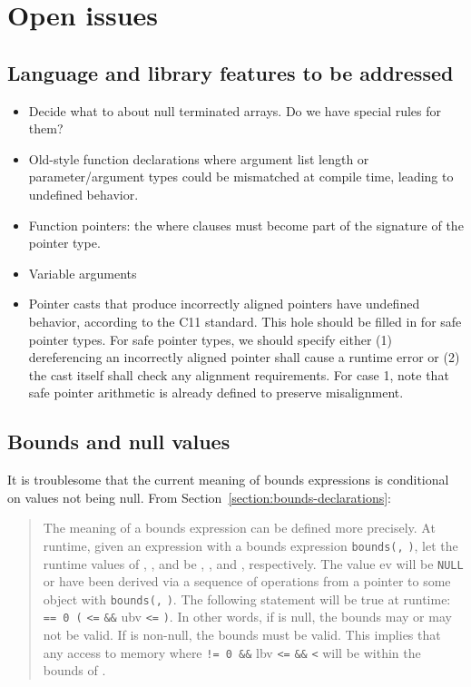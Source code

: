 
\chapter{Open issues}
\label{chapter:open-issues}

\section{Language and library features to be addressed}

\begin{itemize}
\item
  Decide what to about null terminated arrays. Do we have special rules
  for them?
\item
  Old-style function declarations where argument list length or
  parameter/argument types could be mismatched at compile time, leading
  to undefined behavior.
\item
  Function pointers: the where clauses must become part of the signature
  of the pointer type.
\item
  Variable arguments
\item
  Pointer casts that produce incorrectly aligned pointers have undefined
  behavior, according to the C11 standard. This hole should be filled in
  for safe pointer types. For safe pointer types, we should specify
  either (1) dereferencing an incorrectly aligned pointer shall cause a
  runtime error or (2) the cast itself shall check any alignment
  requirements. For case 1, note that safe pointer arithmetic is already
  defined to preserve misalignment.
\end{itemize}

\section{Bounds and null values}

It is troublesome that the current meaning of bounds expressions is
conditional on values not being null. 
From Section~\ref{section:bounds-declarations}:

\begin{quote}
The meaning of a bounds expression can be defined more precisely. At
runtime, given an expression  with a bounds expression
\texttt{bounds(}\texttt{,} \texttt{)}, let the runtime
values of , , and  be , ,
and , respectively. The value ev will be \texttt{NULL} or have
been derived via a sequence of operations from a pointer to some object
 with \texttt{bounds(}\texttt{,}
\texttt{)}. The following statement will be true at runtime:
 \texttt{== 0 \textbar{}\textbar{} (}
\texttt{<=}  \texttt{\&\&} ubv \texttt{<=}
\texttt{)}. In other words, if  is null, the bounds
may or may not be valid. If  is non-null, the bounds must be
valid. This implies that any access to memory where  \texttt{!=
0 \&\&} lbv \texttt{<=}  \texttt{\&\&} 
\texttt{<}  will be within the bounds of .
\end{quote}

